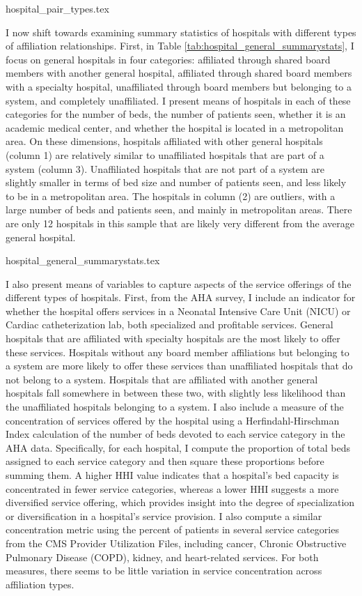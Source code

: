\documentclass[12pt]{article}
\begin{document}
    {hospital_pair_types.tex}

    I now shift towards examining summary statistics of hospitals with different types of affiliation relationships. First, in Table \ref{tab:hospital_general_summarystats}, I focus on general hospitals in four categories: affiliated through shared board members with another general hospital, affiliated through shared board members with a specialty hospital, unaffiliated through board members but belonging to a system, and completely unaffiliated. I present means of hospitals in each of these categories for the number of beds, the number of patients seen, whether it is an academic medical center, and whether the hospital is located in a metropolitan area. On these dimensions, hospitals affiliated with other general hospitals (column 1) are relatively similar to unaffiliated hospitals that are part of a system (column 3). Unaffiliated hospitals that are not part of a system are slightly smaller in terms of bed size and number of patients seen, and less likely to be in a metropolitan area. The hospitals in column (2) are outliers, with a large number of beds and patients seen, and mainly in metropolitan areas. There are only 12 hospitals in this sample that are likely very different from the average general hospital. 

    {hospital_general_summarystats.tex}

    I also present means of variables to capture aspects of the service offerings of the different types of hospitals. First, from the AHA survey, I include an indicator for whether the hospital offers services in a Neonatal Intensive Care Unit (NICU) or Cardiac catheterization lab, both specialized and profitable services. General hospitals that are affiliated with specialty hospitals are the most likely to offer these services. Hospitals without any board member affiliations but belonging to a system are more likely to offer these services than unaffiliated hospitals that do not belong to a system. Hospitals that are affiliated with another general hospitals fall somewhere in between these two, with slightly less likelihood than the unaffiliated hospitals belonging to a system. I also include a measure of the concentration of services offered by the hospital using a Herfindahl-Hirschman Index calculation of the number of beds devoted to each service category in the AHA data. Specifically, for each hospital, I compute the proportion of total beds assigned to each service category and then square these proportions before summing them. A higher HHI value indicates that a hospital's bed capacity is concentrated in fewer service categories, whereas a lower HHI suggests a more diversified service offering, which provides insight into the degree of specialization or diversification in a hospital’s service provision. I also compute a similar concentration metric using the percent of patients in several service categories from the CMS Provider Utilization Files, including cancer, Chronic Obstructive Pulmonary Disease (COPD), kidney, and heart-related services. For both measures, there seems to be little variation in service concentration across affiliation types.
\end{document}
